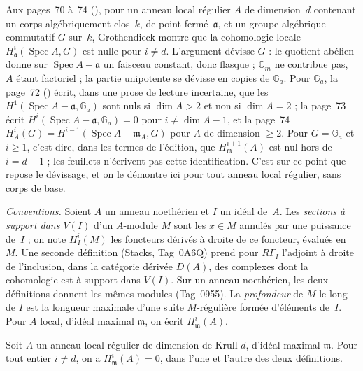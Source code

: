 Aux pages~70 à~74 (), pour un anneau local régulier $A$ de dimension~$d$ contenant un corps algébriquement clos~$k$, de point fermé~$\mathfrak a$, et un groupe algébrique commutatif $G$ sur~$k$, Grothendieck montre que la cohomologie locale $H^i_{\mathfrak a}(\operatorname{Spec} A, G)$ est nulle pour $i \neq d$. L'argument dévisse $G$ : le quotient abélien donne sur $\operatorname{Spec} A - \mathfrak a$ un faisceau constant, donc flasque ; $\mathbb G_m$ ne contribue pas, $A$ étant factoriel ; la partie unipotente se dévisse en copies de $\mathbb G_a$. Pour $\mathbb G_a$, la page~72 () écrit, dans une prose de lecture incertaine, que les $H^1(\operatorname{Spec} A - \mathfrak a, \mathbb G_a)$ sont nuls si $\dim A > 2$ et non si $\dim A = 2$ ; la page~73 écrit $H^i(\operatorname{Spec} A - \mathfrak a, \mathbb G_a) = 0$ pour $i \neq \dim A - 1$, et la page~74 $H^i_A(G) = H^{i-1}(\operatorname{Spec} A - \mathfrak m_A, G)$ pour $A$ de dimension $\geq 2$. Pour $G = \mathbb G_a$ et $i \geq 1$, c'est dire, dans les termes de l'édition, que $H^{i+1}_{\mathfrak m}(A)$ est nul hors de $i = d - 1$ ; les feuillets n'écrivent pas cette identification. C'est sur ce point que repose le dévissage, et on le démontre ici pour tout anneau local régulier, sans corps de base.

\noindent\emph{Conventions.} Soient $A$ un anneau noethérien et $I$ un idéal de~$A$. Les \emph{sections à support dans $V(I)$} d'un $A$-module $M$ sont les $x \in M$ annulés par une puissance de~$I$ ; on note $H^i_I(M)$ les foncteurs dérivés à droite de ce foncteur, évalués en~$M$. Une seconde définition (Stacks, Tag~0A6Q) prend pour $R\Gamma_I$ l'adjoint à droite de l'inclusion, dans la catégorie dérivée $D(A)$, des complexes dont la cohomologie est à support dans $V(I)$. Sur un anneau noethérien, les deux définitions donnent les mêmes modules (Tag~0955). La \emph{profondeur} de $M$ le long de $I$ est la longueur maximale d'une suite $M$-régulière formée d'éléments de~$I$. Pour $A$ local, d'idéal maximal $\mathfrak m$, on écrit $H^i_{\mathfrak m}(A)$.

\begin{encadre}
\begin{theoreme}[d'après la page 72, le cas $G = \mathbb G_a$\piste{43-local-cohomology-concentration}]\label{thm:43-ga}
Soit $A$ un anneau local régulier de dimension de Krull $d$, d'idéal maximal $\mathfrak m$. Pour tout entier $i \neq d$, on a $H^i_{\mathfrak m}(A) = 0$, dans l'une et l'autre des deux définitions.
\end{theoreme}
\end{encadre}

